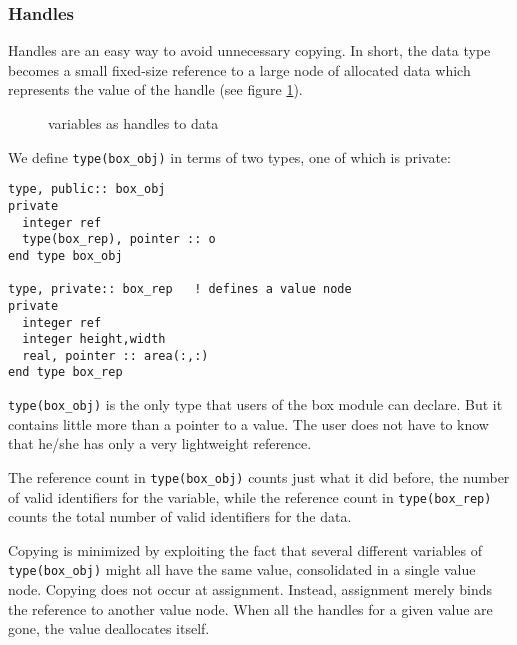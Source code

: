 \subsubsection{Handles}

\label{handlesec}

Handles are an easy way to avoid unnecessary copying.  In short, the
data type becomes a small fixed-size reference to a large node of
allocated data which represents the value of the handle (see figure
\ref{handlefig}).

\begin{figure}
\begin{center}
\caption{variables as handles to data}
\label{handlefig}
\end{center}
\end{figure}

We define \verb+type(box_obj)+ in terms of two types, one of which is
private:

\begin{verbatim}
type, public:: box_obj
private
  integer ref
  type(box_rep), pointer :: o
end type box_obj

type, private:: box_rep   ! defines a value node
private
  integer ref
  integer height,width
  real, pointer :: area(:,:)
end type box_rep
\end{verbatim}

\verb+type(box_obj)+ is the only type that users of the box
module can declare.  But it contains little more than a pointer
to a value.  The user does not have to know that he/she has only a
very lightweight reference.

The reference count in \verb+type(box_obj)+ counts just what it did
before, the number of valid identifiers for the variable, while the
reference count in \verb+type(box_rep)+ counts the total number of
valid identifiers for the data.

Copying is minimized by exploiting the fact that several different
variables of \verb+type(box_obj)+ might all have the same value,
consolidated in a single value node.  Copying does not occur at
assignment.  Instead, assignment merely binds the reference to another
value node.  When all the handles for a given value are gone, the
value deallocates itself.

